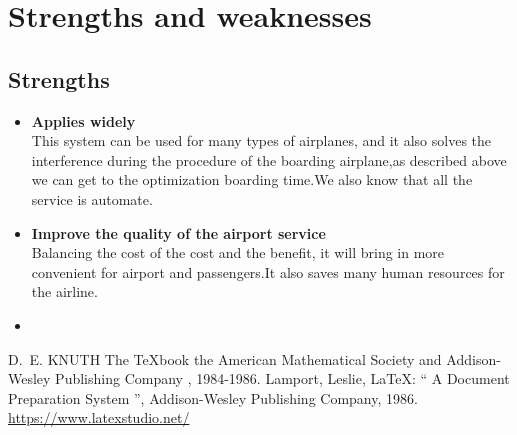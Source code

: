 \documentclass{mcmthesis}
\begin{document}
\section{Strengths and weaknesses}
\lipsum[12]

\subsection{Strengths}
\begin{itemize}
\item \textbf{Applies widely}\\
This  system can be used for many types of airplanes, and it also
solves the interference during  the procedure of the boarding
airplane,as described above we can get to the  optimization
boarding time.We also know that all the service is automate.
\item \textbf{Improve the quality of the airport service}\\
Balancing the cost of the cost and the benefit, it will bring in
more convenient  for airport and passengers.It also saves many
human resources for the airline. \item \textbf{}
\end{itemize}

\begin{thebibliography}{99}
 D.~E. KNUTH   The \TeX{}book  the American
Mathematical Society and Addison-Wesley
Publishing Company , 1984-1986.
Lamport, Leslie,  \LaTeX{}: `` A Document Preparation System '',
Addison-Wesley Publishing Company, 1986.
\url{https://www.latexstudio.net/}
\end{thebibliography}
\end{document}
